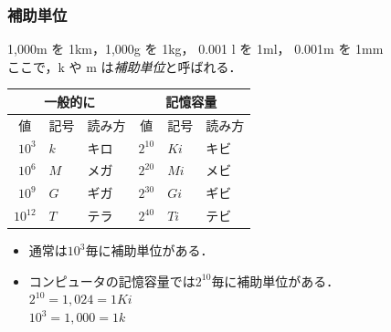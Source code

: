 \documentclass{beamer}                 %
\begin{document}
\begin{frame}
  \frametitle{補助単位}
  1,000m を 1km，1,000g を 1kg， 0.001 l を 1ml， 0.001m を 1mm\\
  ここで，k や m は\emph{補助単位}と呼ばれる．\\

  \begin{center}
    {\small\begin{tabular}{r l l | r l l}\hline\hline
      \multicolumn{3}{c|}{一般的に} &
      \multicolumn{3}{c}{記憶容量} \\
      \hline
      \multicolumn{1}{c}{値} &
      \multicolumn{1}{c}{記号} &
      \multicolumn{1}{c|}{読み方} &
      \multicolumn{1}{c}{値} &
      \multicolumn{1}{c}{記号} &
      \multicolumn{1}{c}{読み方} \\
      \hline
      $10^3$   & $k$ & キロ   & $2^{10}$ & $Ki$ & キビ \\
      $10^6$   & $M$ & メガ   & $2^{20}$ & $Mi$ & メビ \\
      $10^9$   & $G$ & ギガ   & $2^{30}$ & $Gi$ & ギビ \\
      $10^{12}$& $T$ & テラ   & $2^{40}$ & $Ti$ & テビ \\
    \end{tabular}}
  \end{center}

  \begin{itemize}
  \item 通常は$10^3$毎に補助単位がある．
  \item コンピュータの記憶容量では$2^{10}$毎に補助単位がある．\\
    $2^{10} = 1,024 = 1Ki$ \\
    $10^3   = 1,000 = 1k$
  \end{itemize}
\end{frame}
\end{document}
